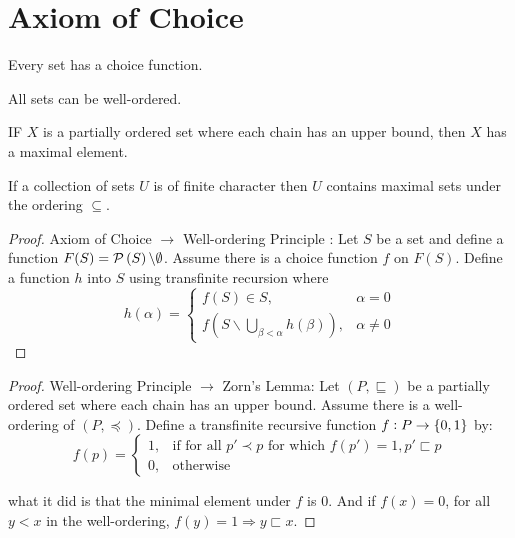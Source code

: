 \section{Axiom of Choice}

\begin{theorem}
    Every set has a choice function.
\end{theorem}

\begin{theorem}
    All sets can be well-ordered.
\end{theorem}

\begin{theorem}
    IF $X$ is a partially ordered set where each chain has an upper bound, then $X$ has a maximal element.
\end{theorem}

\begin{theorem}
    If a collection of sets $U$ is of finite character then $U$ contains maximal sets under the ordering $\subseteq$.
\end{theorem}

\begin{proof}
Axiom of Choice $\rightarrow$ Well-ordering Principle :  Let $S$ be a set and define a function $F(S) = \mathcal{P}\left( S \right) \backslash \emptyset$. Assume there is a choice function $f$ on $F(S)$. Define a function $h$ into $S$ using transfinite recursion where
    \begin{equation}
        h(\alpha) = \begin{cases}
            f(S) \in S, & \alpha = 0 \\
            f\left( \displaystyle S \backslash \bigcup_{\beta < \alpha} h(\beta) \right), & \alpha \neq 0
        \end{cases}
    \end{equation}
\end{proof}    
    
\begin{proof}    
Well-ordering Principle $\rightarrow$ Zorn's Lemma: Let $(P, \sqsubseteq)$ be a partially ordered set where each chain has an upper bound. Assume there is a well-ordering of $(P, \preceq)$. Define a transfinite recursive function $f: P \rightarrow \set{0,1}$ by:
    \begin{equation}
        f(p) = \begin{cases}
            1, & \text{if for all } p' \prec p \text{ for which } f(p') = 1, p' \sqsubset p \\
            0, & \text{otherwise}
        \end{cases}
    \end{equation}

what it did is that the minimal element under $f$ is $0$. And if $f(x) = 0$, for all $y < x$ in the well-ordering, $f(y) = 1 \Rightarrow y \sqsubset x$.
\end{proof}

